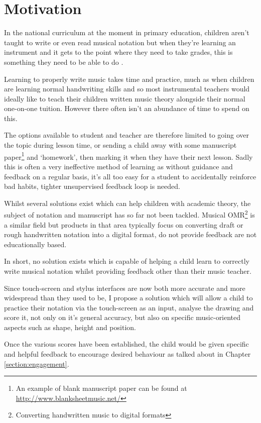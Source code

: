 \section{Motivation}

In the national curriculum at the moment in primary education, children aren't taught to write or even read musical notation \Parencite{Attai5} but when they're learning an instrument and it gets to the point where they need to take grades, this is something they need to be able to do \Parencite{whyMusicTheory}.

Learning to properly write music takes time and practice, much as when children are learning normal handwriting skills and so most instrumental teachers would ideally like to teach their children written music theory alongside their normal one-on-one tuition. However there often isn't an abundance of time to spend on this.

The options available to student and teacher are therefore limited to going over the topic during lesson time, or sending a child away with some manuscript paper\footnote{An example of blank manuscript paper can be found at \url{http://www.blanksheetmusic.net/}} and `homework', then marking it when they have their next lesson. Sadly this is often a very ineffective method of learning as without guidance and feedback on a regular basis, it's all too easy for a student to accidentally reinforce bad habits, tighter unsupervised feedback loop is needed.

Whilst several solutions exist which can help children with academic theory, the subject of notation and manuscript has so far not been tackled. Musical OMR\footnote{Converting handwritten music to digital formats} is a similar field but products in that area typically focus on converting draft or rough handwritten notation into a digital format, do not provide feedback are not educationally based.

In short, no solution exists which is capable of helping a child learn to correctly write musical notation whilst providing feedback other than their music teacher.

Since touch-screen and stylus interfaces are now both more accurate and more widespread than they used to be, I propose a solution which will allow a child to practice their notation via the touch-screen as an input, analyse the drawing and score it, not only on it's general accuracy, but also on specific music-oriented aspects such as shape, height and position.

Once the various scores have been established, the child would be given specific and helpful feedback to encourage desired behaviour as talked about in Chapter \ref{section:engagement}.
